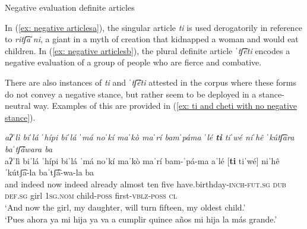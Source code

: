 \ea\label{ex: negative articles}
{Negative evaluation definite articles}

    \label{ex: negative articlesa}
        \label{ex: negative articlesb}
    \z
\z

In (\ref{ex: negative articlesa}), the singular article \textit{ti} is used derogatorily in reference to \textit{ritʃ͡aˈni}, a giant in a myth of creation that kidnapped a woman and would eat children. In (\ref{ex: negative articlesb}), the plural definite article \textit{ˈtʃ͡éti} encodes a negative evaluation of a group of people who are fierce and combative.

There are also instances of \textit{ti} and \textit{ˈtʃ͡éti} attested in the corpus where these forms do not convey a negative stance, but rather seem to be deployed in a stance-neutral way. Examples of this are provided in (\ref{ex: ti and cheti with no negative stance}).

\ea\label{ex: ti and cheti with no negative stance}

    \textit{aʔˈlì biˈlá ˈhípi biˈlá ˈmá noˈkí maˈkò maˈrí bamˈpáma ˈlé \textbf{ti} tiˈwé niˈhê ˈkútʃ͡ara baˈtʃ͡áwara ba}\\
    \gll    aʔˈlì biˈlá ˈhípi biˈlá ˈmá noˈkí maˈkò maˈrí bam-ˈpá-ma aˈlé [\textbf{ti} tiˈwé] niˈhê ˈkútʃ͡a-la baˈtʃ͡á-wa-la ba\\
            and indeed now indeed already almost ten five have.birthday-\textsc{inch-fut.sg} \textsc{dub} {\textsc{def.sg}} girl \textsc{1sg.nom} child-\textsc{poss} first-\textsc{vblz-poss} \textsc{cl}\\
    \glt    `And now the girl, my daughter, will turn fifteen, my oldest child.'\\
    \glt    `Pues ahora ya mi hija ya va a cumplir quince años mi hija la más grande.'   \\

